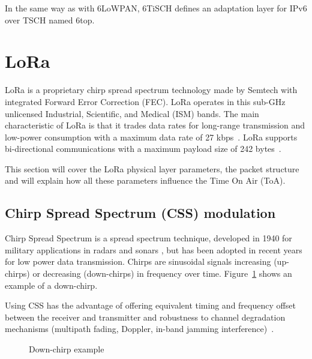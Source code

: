 In the same way as with 6LoWPAN, 6TiSCH defines an adaptation layer for IPv6
over TSCH named 6top.

\section{LoRa\label{section:lora}}

LoRa is a proprietary chirp spread spectrum technology made by Semtech with
integrated Forward Error Correction (FEC).
LoRa operates in this sub-GHz unlicensed Industrial, Scientific, and Medical
(ISM) bands.
The main characteristic of LoRa is that it trades data rates for long-range 
transmission and low-power consumption with a maximum data rate of 
27 kbps~\cite{8030482}.
LoRa supports bi-directional communications with a maximum payload size of 242
bytes~\cite{loraalliance:lorawanspecification}.

This section will cover the LoRa physical layer parameters, the packet structure and 
will explain how all these parameters influence the Time On Air (ToA).

\subsection{Chirp Spread Spectrum (CSS) modulation}

Chirp Spread Spectrum is a spread spectrum technique, developed in 1940 for
military applications in radars and sonars \cite{semtech:modulationbasics}, but
has been adopted in recent years for low power data transmission.
Chirps are sinusoidal signals increasing (up-chirps) or decreasing (down-chirps)
in frequency over time.
Figure~\ref{fig:downchirp} shows an example of a down-chirp.

Using CSS has the advantage of offering equivalent timing and frequency offset
between the receiver and transmitter and robustness to channel degradation
mechanisms (multipath fading, Doppler, in-band jamming
interference)~\cite{semtech:modulationbasics}.


\begin{figure}[H]
\centering
{} 
\caption{Down-chirp example\label{fig:downchirp}}
\end{figure}

